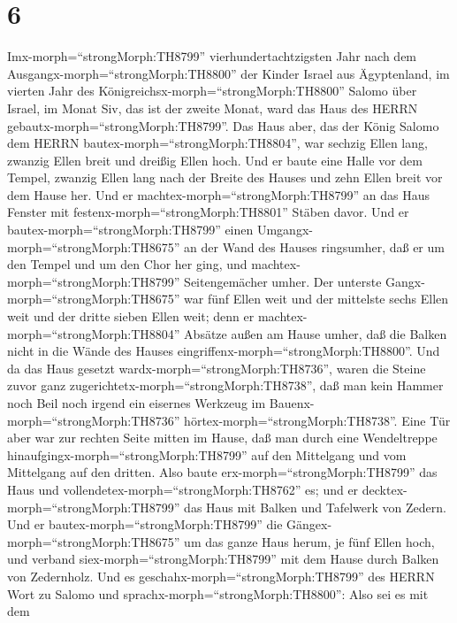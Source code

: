 \hypertarget{section-5}{%
\section{6}\label{section-5}}

 Imx-morph=``strongMorph:TH8799'' vierhundertachtzigsten
Jahr nach dem Ausgangx-morph=``strongMorph:TH8800'' der Kinder Israel
aus Ägyptenland, im vierten Jahr des
Königreichsx-morph=``strongMorph:TH8800'' Salomo über Israel, im Monat
Siv, das ist der zweite Monat, ward das Haus des HERRN
gebautx-morph=``strongMorph:TH8799''.  Das Haus aber, das
der König Salomo dem HERRN bautex-morph=``strongMorph:TH8804'', war
sechzig Ellen lang, zwanzig Ellen breit und dreißig Ellen hoch.
 Und er baute eine Halle vor dem Tempel, zwanzig Ellen lang
nach der Breite des Hauses und zehn Ellen breit vor dem Hause her.
 Und er machtex-morph=``strongMorph:TH8799'' an das Haus
Fenster mit festenx-morph=``strongMorph:TH8801'' Stäben davor.
 Und er bautex-morph=``strongMorph:TH8799'' einen
Umgangx-morph=``strongMorph:TH8675'' an der Wand des Hauses ringsumher,
daß er um den Tempel und um den Chor her ging, und
machtex-morph=``strongMorph:TH8799'' Seitengemächer umher. 
Der unterste Gangx-morph=``strongMorph:TH8675'' war fünf Ellen weit und
der mittelste sechs Ellen weit und der dritte sieben Ellen weit; denn er
machtex-morph=``strongMorph:TH8804'' Absätze außen am Hause umher, daß
die Balken nicht in die Wände des Hauses
eingriffenx-morph=``strongMorph:TH8800''.  Und da das Haus
gesetzt wardx-morph=``strongMorph:TH8736'', waren die Steine zuvor ganz
zugerichtetx-morph=``strongMorph:TH8738'', daß man kein Hammer noch Beil
noch irgend ein eisernes Werkzeug im Bauenx-morph=``strongMorph:TH8736''
hörtex-morph=``strongMorph:TH8738''.  Eine Tür aber war zur
rechten Seite mitten im Hause, daß man durch eine Wendeltreppe
hinaufgingx-morph=``strongMorph:TH8799'' auf den Mittelgang und vom
Mittelgang auf den dritten.  Also baute
erx-morph=``strongMorph:TH8799'' das Haus und
vollendetex-morph=``strongMorph:TH8762'' es; und er
decktex-morph=``strongMorph:TH8799'' das Haus mit Balken und Tafelwerk
von Zedern.  Und er bautex-morph=``strongMorph:TH8799'' die
Gängex-morph=``strongMorph:TH8675'' um das ganze Haus herum, je fünf
Ellen hoch, und verband siex-morph=``strongMorph:TH8799'' mit dem Hause
durch Balken von Zedernholz.  Und es
geschahx-morph=``strongMorph:TH8799'' des HERRN Wort zu Salomo und
sprachx-morph=``strongMorph:TH8800'':  Also sei es mit dem
